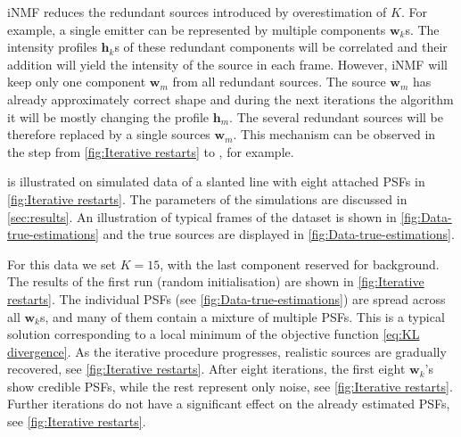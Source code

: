iNMF reduces the redundant sources introduced by overestimation of $K$. For example, a single emitter can be represented by multiple components $\bm{w}_k$s. The intensity profiles $\bm{h}_k$s of these redundant components will be correlated and their addition will yield the intensity of the source in each frame. However, iNMF will keep only one component $\bm{w}_m$ from all redundant sources. The source $\bm{w}_m$ has already approximately correct shape and during the next iterations the algorithm it will be mostly changing the profile $\bm{h}_m$. The several redundant sources will be therefore replaced by a single sources $\bm{w}_m$. This mechanism can be observed in the step from \autoref{fig:Iterative restarts}\bbb{} to \ccc{}, for example.  

\inmf{} is illustrated on simulated data of a slanted line with eight attached PSFs in \autoref{fig:Iterative restarts}. The parameters of the simulations are discussed in  \autoref{sec:results}. An illustration of typical frames of the dataset is shown in \autoref{fig:Data-true-estimations}\aaa{} and the true sources are displayed in \autoref{fig:Data-true-estimations}\bbb.

For this data we set $K=15$, with the last component reserved for background. The results of the first run (random initialisation) are shown in \autoref{fig:Iterative restarts}\aaa. The individual PSFs (see \autoref{fig:Data-true-estimations}\bbb) are spread across all $\bm{w}_k$s, and many of them contain a mixture of multiple PSFs. This is a typical solution corresponding to a local minimum of the objective function \autoref{eq:KL divergence}. As the iterative procedure progresses, realistic sources are gradually recovered, see \autoref{fig:Iterative restarts}\bbb. After eight iterations, the first eight $\bm{w}_k$'s show credible PSFs, while the rest represent only noise, see \autoref{fig:Iterative restarts}\ccc. Further iterations do not have a significant effect on the already estimated PSFs, see \autoref{fig:Iterative restarts}\ddd. 

